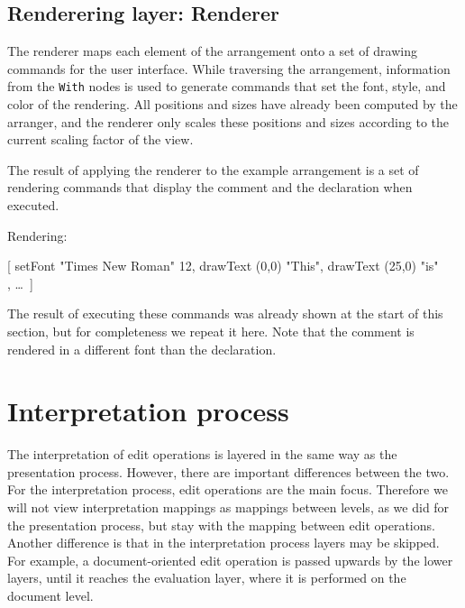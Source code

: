 %																
\subsection{Renderering layer: Renderer} \label{sect:renderer}

The renderer maps each element of the arrangement onto a set of drawing commands for the user interface. While traversing the arrangement, information from the \verb|With| nodes is used to generate commands that set the font, style, and color of the rendering. All positions and sizes have already been computed by the arranger, and the renderer only scales these positions and sizes according to the current scaling factor of the view. 


 The result of applying the renderer to the example arrangement is a set of rendering commands that display the comment and the declaration when executed.


Rendering:
\small \ttfamily

[ setFont "Times New Roman" 12,  drawText (0,0) "This", drawText (25,0) "is"\\
, \dots ~]
 
\rmfamily \normalsize
The result of executing these commands was already shown at the start of this section, but for completeness we repeat it here. Note that the comment is rendered in a different font than the declaration. 

\begin{center}
\end{center}

%																
%																
%																
\section{Interpretation process} \label{sect:intrProcess}

The interpretation of edit operations is layered in the same way as the presentation process. However, there are important differences between the two. For the interpretation process, edit operations are the main focus. Therefore we will not view interpretation mappings as mappings between levels, as we did for the presentation process, but stay with the mapping between edit operations. \bc Another difference is that in the interpretation process layers may be skipped. For example, a document-oriented edit operation is passed upwards by the lower layers, until it reaches the evaluation layer, where it is performed on the document level. \ec



